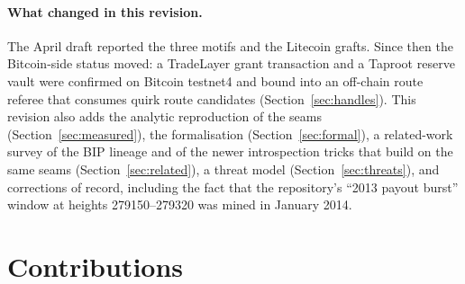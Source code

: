 \documentclass[11pt]{article}
\begin{document}
\paragraph{What changed in this revision.} The April draft reported the three
motifs and the Litecoin grafts. Since then the Bitcoin-side status moved: a
TradeLayer grant transaction and a Taproot reserve vault were confirmed on
Bitcoin testnet4 and bound into an off-chain route referee that consumes quirk
route candidates (Section~\ref{sec:handles}). This revision also adds the
analytic reproduction of the seams (Section~\ref{sec:measured}), the
formalisation (Section~\ref{sec:formal}), a related-work survey of the BIP
lineage and of the newer introspection tricks that build on the same seams
(Section~\ref{sec:related}), a threat model (Section~\ref{sec:threats}), and
corrections of record, including the fact that the repository's ``2013 payout
burst'' window at heights 279150--279320 was mined in January 2014.

\section{Contributions}
\end{document}
